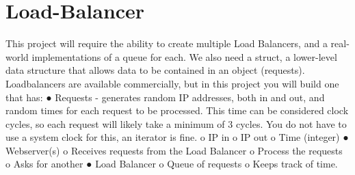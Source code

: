 \chapter{Load-\/\+Balancer}
\hypertarget{md__r_e_a_d_m_e}{}\label{md__r_e_a_d_m_e}
\label{md__r_e_a_d_m_e_autotoc_md0}%
%
 This project will require the ability to create multiple Load Balancers, and a real-\/world implementations of a queue for each. We also need a struct, a lower-\/level data structure that allows data to be contained in an object (requests). Loadbalancers are available commercially, but in this project you will build one that has\+: ● Requests -\/ generates random IP addresses, both in and out, and random times for each request to be processed. This time can be considered clock cycles, so each request will likely take a minimum of 3 cycles. You do not have to use a system clock for this, an iterator is fine. o IP in o IP out o Time (integer) ● Webserver(s) o Receives requests from the Load Balancer o Process the requests o Asks for another ● Load Balancer o Queue of requests o Keeps track of time. 
